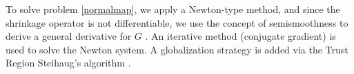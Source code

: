 \begin{rmk}
 To solve problem \ref{normalmap}, we apply a Newton-type method, and since the shrinkage operator is not differentiable, we use the concept of semismoothness to derive a general derivative for $G$ \cite{}. An iterative method (conjugate gradient) is used to solve the Newton system. A globalization strategy is added via the Trust Region Steihaug's algorithm \cite{pieperthesis,steihaug1983}.
\end{rmk}


